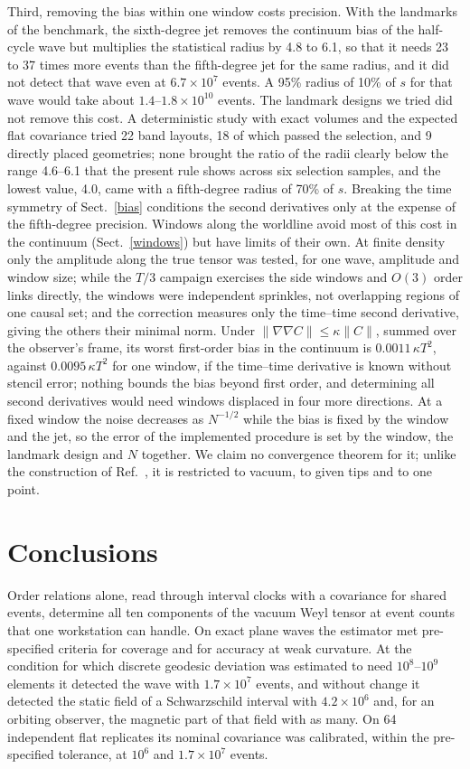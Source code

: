 \documentclass[11pt,a4paper]{article}
\begin{document}
Third, removing the bias within one window costs precision. With the
landmarks of the benchmark, the sixth-degree jet removes the continuum bias
of the half-cycle
wave but multiplies the statistical radius by 4.8 to 6.1, so that it needs
23 to 37 times more events than the fifth-degree jet for the same radius,
and it did not detect that wave even at $6.7\times10^7$ events. A 95\%
radius of 10\% of $s$ for that wave would take about
$1.4$--$1.8\times10^{10}$ events. The landmark designs we tried did not
remove this cost. A deterministic study with exact volumes and the expected
flat covariance tried 22 band layouts, 18 of which passed the selection, and
9 directly placed geometries; none brought the ratio of the radii clearly
below the range 4.6--6.1 that the present rule shows across six selection
samples, and the lowest value, 4.0, came with a fifth-degree radius of 70\%
of $s$. Breaking the time symmetry of Sect.~\ref{bias} conditions the second
derivatives only at the expense of the fifth-degree precision. Windows along
the worldline avoid most of this cost in the continuum (Sect.~\ref{windows})
but have limits of their own. At finite density only the amplitude along the
true tensor was tested, for one wave, amplitude and window size; while the
$T/3$ campaign exercises the side windows and $O(3)$ order links directly,
the windows were independent sprinkles, not overlapping regions of one causal set; and
the correction measures only the time--time second derivative, giving the
others their minimal norm. Under $\|\nabla\nabla C\|\le\kappa\|C\|$, summed
over the observer's frame, its worst first-order bias in the continuum is
$0.0011\,\kappa T^2$, against $0.0095\,\kappa T^2$ for one window, if the
time--time derivative is known without stencil error; nothing bounds the
bias beyond first order, and determining all second derivatives would need
windows displaced in four more directions. At a fixed
window the noise decreases as
$N^{-1/2}$ while the bias is fixed by the window and the jet, so the error
of the implemented procedure is set by the window, the landmark design and
$N$ together. We claim no convergence theorem for it; unlike the
construction of Ref.~\cite{madsen}, it is restricted to vacuum, to given
tips and to one point.

\section{Conclusions}\label{conclusions}
Order relations alone, read through interval clocks with a covariance for
shared events, determine all ten components of the vacuum Weyl tensor at
event counts that one workstation can handle. On exact plane waves the
estimator met pre-specified criteria for coverage and for accuracy at weak
curvature. At the condition for which discrete geodesic deviation was
estimated to need $10^8$--$10^9$ elements it detected the wave with
$1.7\times10^7$ events, and without change it detected the static field of a
Schwarzschild interval with $4.2\times10^6$ and, for an orbiting observer,
the magnetic part of that field with as many. On 64 independent flat
replicates its nominal covariance was calibrated, within the pre-specified
tolerance, at $10^6$ and $1.7\times10^7$ events.
\end{document}
